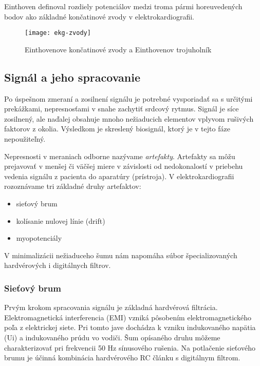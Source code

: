 \documentclass[titlepage,12pt]{article}
\begin{document}
Einthoven definoval rozdiely potenciálov medzi troma pármi horeuvedených bodov ako základné končatinové zvody v elektrokardiografii.


\begin{figure}[!ht]
\begin{center}
\texttt{[image: ekg-zvody]}
\caption{Einthovenove končatinové zvody a Einthovenov trojuholník}
\end{center}
\end{figure}


\subsection{Signál a jeho spracovanie}
Po úspešnom zmeraní a zosilnení signálu je potrebné vysporiadať sa s určitými prekážkami, nepresnosťami v snahe zachytiť srdcový rytmus. Signál je síce zosilnený, ale naďalej obsahuje mnoho nežiaducich elementov vplyvom rušivých faktorov z okolia. Výsledkom je skreslený biosignál, ktorý je v tejto fáze nepoužiteľný.

Nepresnosti v meraniach odborne nazývame \emph{artefakty}. Artefakty sa môžu prejavovať \linebreak v menšej či väčšej miere v závislosti od nedokonalostí v priebehu vedenia signálu z pacienta do aparatúry (prístroja). V elektrokardiografii rozoznávame tri základné druhy artefaktov:
\begin{itemize}
	\item sieťový brum
	\item kolísanie nulovej línie (drift)
	\item myopotenciály
\end{itemize}

V minimalizácii nežiaduceho šumu nám napomáha súbor špecializovaných hardvérových \linebreak i digitálnych filtrov.

\subsubsection{Sieťový brum}
Prvým krokom spracovania signálu je základná hardvérová filtrácia. Elektromagnetická \linebreak interferencia (EMI) vzniká pôsobením  elektromagnetického poľa z elektrickej siete. Pri tomto jave dochádza k vzniku indukovaného napätia (Ui) a indukovaného prúdu vo vodiči. Šum opísaného druhu môžeme charakterizovať pri frekvencii 50 Hz sínusového rušenia. Na potlačenie sieťového brumu je účinná kombinácia hardvérového RC článku s digitálnym filtrom. 
\end{document}
